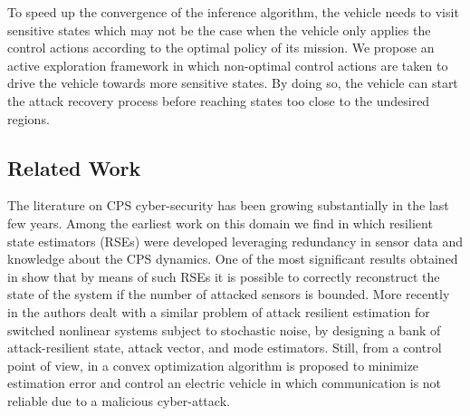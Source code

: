 \documentclass[letterpaper, 10 pt, conference]{ieeeconf}  %
\newcommand\NB[1]{$\spadesuit$\footnote{NB: #1}}
\begin{document}
To speed up the convergence of the inference algorithm, the vehicle needs to visit sensitive states which may not be the case when the vehicle only applies the control actions according to the optimal policy of its mission. We propose an active exploration framework in which non-optimal control actions are taken to drive the vehicle towards more sensitive states. By doing so, the vehicle can start the attack recovery process before reaching states too close to the undesired regions.%


\subsection{Related Work}\label{subsec:related}

The literature on CPS cyber-security has been growing substantially in the last few years. 
Among the earliest work on this domain we find \cite{fawzi2014secure, ivanov2014attack, pajic2014robustness, bezzo2014attack} in which resilient state estimators (RSEs) were developed leveraging redundancy in sensor data and knowledge about the CPS dynamics. One of the most significant results obtained in \cite{fawzi2014secure, pajic2014robustness} show that by means of such RSEs it is possible to correctly reconstruct the state of the system if the number of attacked sensors is bounded.
More recently in \cite{kim2017attack} the authors dealt with a similar problem of attack resilient estimation for switched nonlinear systems subject to stochastic noise, by designing a bank of attack-resilient state, attack vector, and mode estimators. Still, from a control point of view, in \cite{rana2017attack} a convex optimization algorithm is proposed to minimize estimation error and control an electric vehicle in which communication is not reliable due to a malicious cyber-attack. 
\end{document}
